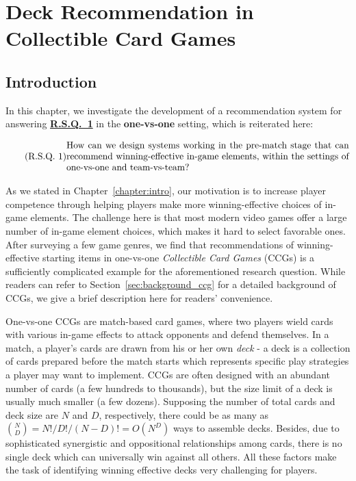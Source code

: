 \chapter{Deck Recommendation in Collectible Card Games} 

\label{chapter:qdeckrec} 


\section{Introduction}\label{sec:introduction}

In this chapter, we investigate the development of a recommendation system for answering \hyperref[rq1]{\textbf{R.S.Q.~1}} in the \textbf{one-vs-one} setting, which is reiterated here:

\begin{equation}
  \tag{R.S.Q. 1}\label{chapter3_rq1}
  \parbox{\dimexpr\linewidth-4em}{%
    \strut
    How can we design systems working in the pre-match stage that can recommend winning-effective in-game elements, within the settings of one-vs-one and team-vs-team?
    \strut
  }
\end{equation}

As we stated in Chapter~\ref{chapter:intro}, our  motivation is to increase player competence through helping players make more winning-effective choices of in-game elements. The challenge here is that most modern video games offer a large number of in-game element choices, which makes it hard to select favorable ones. After surveying a few game genres, we find that recommendations of winning-effective starting items in one-vs-one \textit{Collectible Card Games} (CCGs) is a sufficiently complicated example for the aforementioned research question. While readers can refer to Section~\ref{sec:background_ccg} for a detailed background of CCGs, we give a brief description here for readers' convenience.

One-vs-one CCGs are match-based card games, where two players wield cards with various in-game effects to attack opponents and defend themselves. In a match, a player's cards are drawn from his or her own \textit{deck} - a deck is a collection of cards prepared before the match starts which represents specific play strategies a player may want to implement. CCGs are often designed with an abundant number of cards (a few hundreds to thousands), but the size limit of a deck is usually much smaller (a few dozens). Supposing the number of total cards and deck size are $N$ and $D$, respectively, there could be as many as ${N\choose D}=N!/D!/(N-D)!=O(N^D)$ ways to assemble decks. Besides, due to sophisticated synergistic and oppositional relationships among cards, there is no single deck which can universally win against all others. All these factors make the task of identifying winning effective decks very challenging for players. 



